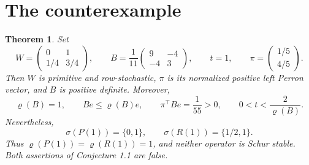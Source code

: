 \documentclass[11pt]{article}
\newtheorem{theorem}{Theorem}
\newcommand{\rhoo}{\varrho}
\begin{document}
\clearpage
\section{The counterexample}
\begin{theorem}\label{thm:main}
Set
\begin{equation}\label{eq:data}
 W=\begin{pmatrix}0&1\\[1pt]1/4&3/4\end{pmatrix},\qquad
 B=\frac1{11}\begin{pmatrix}9&-4\\-4&3\end{pmatrix},\qquad
 t=1,\qquad \pi=\begin{pmatrix}1/5\\4/5\end{pmatrix}.
\end{equation}
Then $W$ is primitive and row-stochastic, $\pi$ is its normalized positive
left Perron vector, and $B$ is positive definite. Moreover,
\[
 \rhoo(B)=1,\qquad Be\leq\rhoo(B)e,\qquad
 \pi^\top Be=\frac1{55}>0,\qquad 0<t<\frac2{\rhoo(B)}.
\]
Nevertheless,
\[
 \sigma(P(1))=\{0,1\},\qquad \sigma(R(1))=\{1/2,1\}.
\]
Thus $\rhoo(P(1))=\rhoo(R(1))=1$, and neither operator is Schur stable.
Both assertions of Conjecture 1.1 are false.
\end{theorem}
\end{document}
